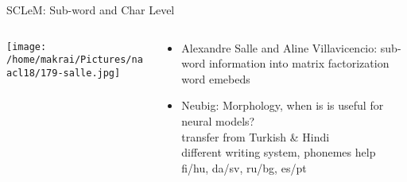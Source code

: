 \documentclass{beamer}
\begin{document}
  \begin{frame}[allowframebreaks]{SCLeM: Sub-word and Char Level}
    \begin{columns}
      \begin{column}{.35\textwidth}
        \centering
    \texttt{[image: /home/makrai/Pictures/naacl18/179-salle.jpg]}
      \end{column}
      \begin{column}{.65\textwidth}
        \begin{itemize} 
          \item
            Alexandre Salle and Aline Villavicencio: 
            sub-word information into matrix factorization word emebeds
          \item Neubig: Morphology, when is is useful for neural models?
            \\ transfer from Turkish \& Hindi
            \\ different writing system, phonemes help
            \\ fi/hu, da/sv, ru/bg, es/pt
        \end{itemize}
      \end{column} 
    \end{columns}
  \end{frame}

\end{document}
